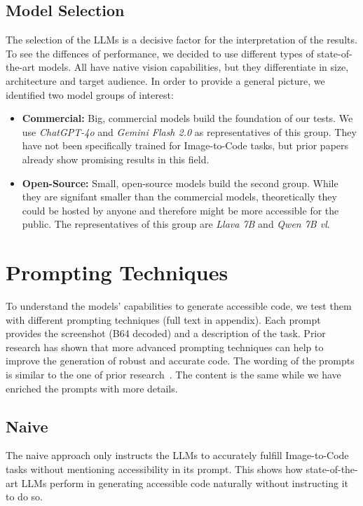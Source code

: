 \subsection{Model Selection}
The selection of the LLMs is a decisive factor for the interpretation of the results.
To see the diffences of performance, we decided to use different types of 
state-of-the-art models. All have native vision capabilities, but they differentiate 
in size, architecture and target audience.
In order to provide a general picture, we identified two model groups of interest:
\begin{itemize}
  \item \textbf{Commercial:} Big, commercial models build the foundation of our tests.
    We use \textit{ChatGPT-4o} and \textit{Gemini Flash 2.0} as representatives of this group.
    They have not been specifically trained for Image-to-Code tasks, but prior papers 
    already show promising results in this field.
  \item \textbf{Open-Source:} Small, open-source models build the second group. 
    While they are signifant smaller than the commercial models, theoretically they 
    could be hosted by anyone and therefore might be more accessible for the public.
    The representatives of this group are \textit{Llava 7B}
    and \textit{Qwen 7B vl}.
\end{itemize}

\section{Prompting Techniques}
To understand the models' capabilities to generate accessible code, we test
them with different prompting techniques (full text in appendix). Each 
prompt provides the screenshot (B64 decoded) and a description of the
task.\newline
Prior research has shown that more 
advanced prompting techniques can help to improve the generation of robust and 
accurate code.
The wording of the prompts is similar to the one of prior research~\parencite{suh2025accessiblecode, xiao2024interaction2code}.
The content is the same while we have enriched the prompts with more details.\newline

\subsection{Naive}
The naive approach only instructs the LLMs to accurately fulfill Image-to-Code tasks
without mentioning accessibility in its prompt. This shows how state-of-the-art 
LLMs perform in generating accessible code naturally without instructing it to 
do so.

